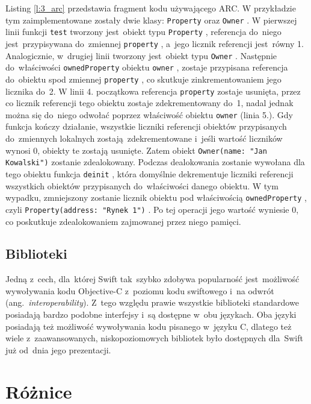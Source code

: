 \documentclass[mgr, shortabstract]{iithesis}
\newcommand{\ang}[1]{ang.~\textit{#1}}
\newcommand{\swiftinline}[1]{
    \texttt{#1}
}
\begin{document}
Listing \ref{l:3_arc} przedstawia fragment kodu używającego ARC. W przykładzie tym zaimplementowane zostały dwie klasy: \swiftinline{Property} oraz \swiftinline{Owner}. W pierwszej linii funkcji \swiftinline{test} tworzony jest~obiekt typu \swiftinline{Property}, referencja do~niego jest~przypisywana do~zmiennej \swiftinline{property}, a~jego licznik referencji jest~równy 1. Analogicznie, w~drugiej linii tworzony jest~obiekt typu \swiftinline{Owner}. Następnie do~właściwości \swiftinline{ownedProperty} obiektu \swiftinline{owner}, zostaje przypisana referencja do~obiektu spod zmiennej \swiftinline{property}, co skutkuje zinkrementowaniem jego licznika do~2. W linii 4. początkowa referencja \swiftinline{property} zostaje usunięta, przez co licznik referencji tego obiektu zostaje zdekrementowany do~1, nadal jednak można się do~niego odwołać poprzez właściwość obiektu \swiftinline{owner} (linia 5.). Gdy funkcja kończy działanie, wszystkie liczniki referencji obiektów przypisanych do~zmiennych lokalnych zostają zdekrementowane i~jeśli wartość liczników wynosi 0, obiekty te zostają usunięte. Zatem obiekt \swiftinline{Owner(name: "Jan Kowalski")} zostanie zdealokowany. Podczas dealokowania zostanie wywołana dla tego obiektu funkcja \swiftinline{deinit}, która domyślnie dekrementuje liczniki referencji wszystkich obiektów przypisanych do~właściwości danego obiektu. W tym wypadku, zmniejszony zostanie licznik obiektu pod właściwością \swiftinline{ownedProperty}, czyli \swiftinline{Property(address: "Rynek 1")}. Po tej operacji jego wartość wyniesie 0, co poskutkuje zdealokowaniem zajmowanej przez niego pamięci.

\subsection{Biblioteki}

Jedną z~cech, dla~której Swift tak~szybko zdobywa popularność jest~możliwość wywoływania kodu Objective-C z~poziomu kodu swiftowego i~na odwrót (\ang{interoperability}). Z~tego względu prawie wszystkie biblioteki standardowe posiadają bardzo podobne interfejsy i~są dostępne w~obu językach. Oba języki posiadają też możliwość wywoływania kodu pisanego w~języku C, dlatego też wiele z~zaawansowanych, niskopoziomowych bibliotek było dostępnych dla~Swift już od~dnia jego prezentacji.

\section{Różnice}
\end{document}
